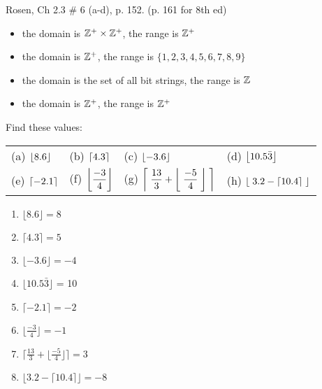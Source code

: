 \begin{questions}
 Rosen, Ch 2.3 \# 6 (a-d), p. 152. (p. 161 for 8th ed)
   \ifprintanswers
        \vspace{-15pt}
   \fi
	\begin{solution}
	\begin{itemize}[itemsep=0pt,parsep=0pt,topsep=0pt,partopsep=0pt]
	    \item[(a)] the domain is $\mathbb{Z}^+ \times \mathbb{Z}^+$, the range is $\mathbb{Z}^+$
	    \item[(b)] the domain is $\mathbb{Z}^+$, the range is $\{1, 2, 3, 4, 5, 6, 7, 8,
	9\}$
		\item[(c)] the domain is the set of all bit strings, the range is $\mathbb{Z}$
	    \item[(d)] the domain is $\mathbb{Z}^+$, the range is $\mathbb{Z}^+$
	\end{itemize}
	\end{solution}




 Find these values:
\ifprintanswers
	\vspace{-10pt}
\else

\renewcommand{\arraystretch}{1.3}
\begin{tabular}{llll}
	(a) $\displaystyle \left\lfloor 8.6 \right\rfloor$ & (b) $\displaystyle \left\lceil 4.3 \right\rceil$ & 
	 (c) $\displaystyle \left\lfloor -3.6 \right\rfloor$  & (d) $\displaystyle \left\lfloor 10.5\bar{3} \right\rfloor $\\
	(e) $\displaystyle \left\lceil -2.1 \right\rceil$  & (f) $\displaystyle \left\lfloor \frac{-3}{4} \right\rfloor$ & 
	 (g) $\displaystyle \left\lceil \;\frac{13}{3}  + \left\lfloor \;\frac{-5}{4}\; \right\rfloor \; \right\rceil$ &
	 (h) $\displaystyle \left\lfloor \;3.2 - \left\lceil 10.4 \right\rceil \; \right\rfloor $\\
\end{tabular}
\fi
\begin{solution}
	\vspace{-5pt}
	\begin{enumerate}[label=(\alph*),itemsep=3pt,parsep=0pt,topsep=0pt,partopsep=0pt]
		\item $\lfloor 8.6 \rfloor = 8$
		\item $\lceil 4.3 \rceil = 5$
		\item $\lfloor -3.6 \rfloor = -4$
		\item $\lfloor 10.5\bar{3} \rfloor $ = 10
		\item $\lceil -2.1 \rceil = -2$
		\item $\lfloor \frac{-3}{4} \rfloor = -1$ 
		\item $\lceil \frac{13}{3} + \lfloor \frac{-5}{4} \rfloor \rceil = 3$
		\item $\lfloor 3.2 - \lceil 10.4 \rceil \rfloor = -8$
	\end{enumerate}
\end{solution}


\end{questions}
